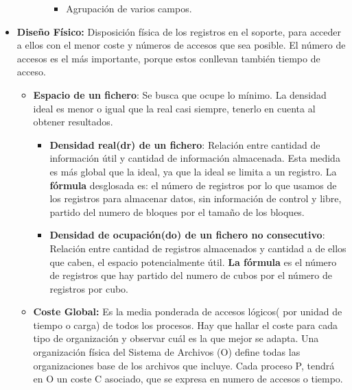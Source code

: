 \documentclass[12pt, twoside, openright]{report} %
\begin{document}
\begin{itemize}
\begin{itemize}
\begin{itemize}
\begin{itemize}
          \item
            
            Agrupación de varios campos.
            
          \end{itemize}
        \end{itemize}
      \end{itemize}
    \item \textbf{Diseño Físico:} Disposición física de los registros en el
      soporte, para acceder a ellos con el menor coste y números de
      accesos que sea posible. El número de accesos es el más
      importante, porque estos conllevan también tiempo de acceso.
      

      \begin{itemize}
      \item \textbf{Espacio de un fichero}: Se busca que ocupe lo mínimo. La
        densidad ideal es menor o igual que la real casi siempre,
        tenerlo en cuenta al obtener resultados.
        

        \begin{itemize}
        \item \textbf{Densidad real(dr) de un fichero}: Relación entre
          cantidad de información útil y cantidad de información
          almacenada. Esta medida es más global que la ideal, ya que la
          ideal se limita a un registro. La \textbf{fórmula} desglosada
          es: el número de registros por lo que usamos de los registros
          para almacenar datos, sin información de control y libre,
          partido del numero de bloques por el tamaño de los bloques.
          
        \item \textbf{Densidad de ocupación(do) de un fichero no
          consecutivo}: Relación entre cantidad de registros almacenados
          y cantidad a de ellos que caben, el espacio potencialmente
          útil. \textbf{La fórmula} es el número de registros que hay
          partido del numero de cubos por el número de registros por
          cubo.
          
        \end{itemize}
		\pagebreak
      \item \textbf{Coste Global:} Es la media ponderada de accesos lógicos(
        por unidad de tiempo o carga) de todos los procesos. Hay que
        hallar el coste para cada tipo de organización y observar cuál
        es la que mejor se adapta. Una organización física del Sistema
        de Archivos (O) define todas las organizaciones base de los
        archivos que incluye. Cada proceso P, tendrá en O un coste C
        asociado, que se expresa en numero de accesos o tiempo.
        


\end{itemize}
\end{itemize}
\end{document}
